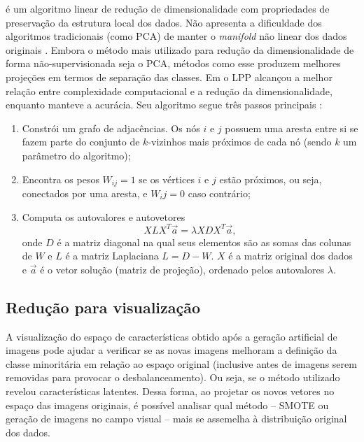  é um algoritmo linear de redução de dimensionalidade com propriedades de preservação da estrutura local dos dados. Não apresenta a dificuldade dos algoritmos tradicionais (como PCA) de manter o \textit{manifold} não linear dos dados originais \cite{Zhuo2014}. Embora o método mais utilizado para redução da dimensionalidade de forma não-supervisionada seja o PCA, métodos como esse produzem melhores projeções em termos de separação das classes. Em  o LPP alcançou a melhor relação entre complexidade computacional e a redução da dimensionalidade, enquanto manteve a acurácia. Seu algoritmo segue três passos principais \cite{He2004}:

\begin{enumerate}
\item Constrói um grafo de adjacências. Os nós $i$ e $j$ possuem uma aresta entre si se fazem parte do conjunto de $k$-vizinhos mais próximos de cada nó (sendo $k$ um parâmetro do algoritmo);

\item Encontra os pesos $W_{ij} = 1$ se os vértices $i$ e $j$ estão próximos, ou seja, conectados por uma aresta, e $W_ij = 0$ caso contrário;

\item Computa os autovalores e autovetores
\begin{equation}
    X L X^T \vec{a} = \lambda X D X^T \vec{a},
\end{equation}
\noindent onde $D$ é a matriz diagonal na qual seus elementos são as somas das colunas de $W$ e $L$ é a matriz Laplaciana $L = D - W$. $X$ é a matriz original dos dados e $\vec{a}$ é o vetor solução (matriz de projeção), ordenado pelos autovalores $\lambda$.
\end{enumerate}

\subsection{Redução para visualização}

A visualização do espaço de características obtido após a geração artificial de imagens pode ajudar a verificar se as novas imagens melhoram a definição da classe minoritária em relação ao espaço original (inclusive antes de imagens serem removidas para provocar o desbalanceamento). Ou seja, se o método utilizado revelou características latentes. Dessa forma, ao projetar os novos vetores no espaço das imagens originais, é possível analisar qual método -- SMOTE ou geração de imagens no campo visual -- mais se assemelha à distribuição original dos dados.


